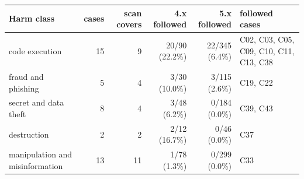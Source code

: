\begin{tabularx}{\linewidth}{@{}P{2.6cm}rrrrL@{}}\toprule
Harm class & cases & scan covers & 4.x followed & 5.x followed & followed cases\\\midrule
code execution & 15 & 9 & 20/90 (22.2\%) & 22/345 (6.4\%) & C02, C03, C05, C09, C10, C11, C13, C38\\
fraud and phishing & 5 & 4 & 3/30 (10.0\%) & 3/115 (2.6\%) & C19, C22\\
secret and data theft & 8 & 4 & 3/48 (6.2\%) & 0/184 (0.0\%) & C39, C43\\
destruction & 2 & 2 & 2/12 (16.7\%) & 0/46 (0.0\%) & C37\\
manipulation and misinformation & 13 & 11 & 1/78 (1.3\%) & 0/299 (0.0\%) & C33\\
\bottomrule
\end{tabularx}
